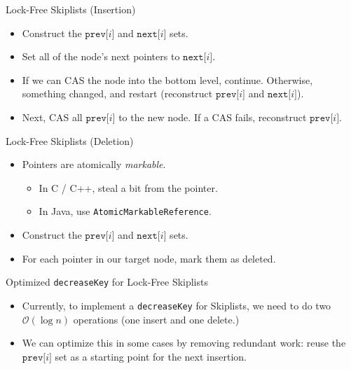 \documentclass{beamer}
\begin{document}
\begin{frame}{Lock-Free Skiplists (Insertion)}
  \begin{itemize}
    \item Construct the $\mathtt{prev[}i\mathtt{]}$ and $\mathtt{next[}i\mathtt{]}$ sets.
    \item Set all of the node's next pointers to $\mathtt{next[}i\mathtt{]}$.
    \item If we can CAS the node into the bottom level, continue. Otherwise, something changed, and
      restart (reconstruct $\mathtt{prev[}i\mathtt{]}$ and $\mathtt{next[}i\mathtt{]}$).
    \item Next, CAS all $\mathtt{prev[}i\mathtt{]}$ to the new node. If a CAS fails, reconstruct
      $\mathtt{prev[}i\mathtt{]}$.
  \end{itemize}
\end{frame}

\begin{frame}{Lock-Free Skiplists (Deletion)}
  \begin{itemize}
    \item Pointers are atomically \textit{markable}.
      \begin{itemize}
        \item In C / C++, steal a bit from the pointer.
        \item In Java, use \texttt{AtomicMarkableReference}.
      \end{itemize}
    \item Construct the $\mathtt{prev[}i\mathtt{]}$ and $\mathtt{next[}i\mathtt{]}$ sets.
    \item For each pointer in our target node, mark them as deleted.
  \end{itemize}
\end{frame}

\begin{frame}{Optimized \texttt{decreaseKey} for Lock-Free Skiplists}
  \begin{itemize}
    \item Currently, to implement a \texttt{decreaseKey} for Skiplists, we need to
      do two $\mathcal{O}(\log n)$ operations (one insert and one delete.)
    \item We can optimize this in some cases by removing redundant work: reuse the
      $\mathtt{prev[}i\mathtt{]}$ set as a starting point for the next insertion.
  \end{itemize}
\end{frame}
\end{document}
